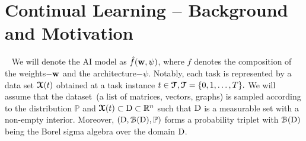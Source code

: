 \section{Continual Learning -- Background and Motivation}~\label{sec:motivation}
We will denote the AI model as $\hat{f}(\boldsymbol{\mathrm{w}}, \psi)$, where  $f$ denotes the composition of the weights$-\boldsymbol{\mathrm{w}}$ and the architecture$-\psi.$ Notably, each task is represented by a data set $\boldsymbol{\mathcal{X}}(t)$ obtained at a task instance $t \in \boldsymbol{\mathcal{T}}, \boldsymbol{\mathcal{T}} = \{0,1,\ldots, T\}.$ We will assume that the dataset~(a list of matrices, vectors, graphs) is sampled according to the distribution $\mathbb{P}$ and $\boldsymbol{\mathcal{X}}(t) \subset \mathrm{D} \subset \mathbb{R}^n$ such that $\mathrm{D}$  is a measurable set with a non-empty interior. Moreover, $(\mathrm{D}, \mathcal{B}(\mathrm{D}), \mathbb{P})$ forms a probability triplet with $\mathcal{B}(\mathrm{D})$ being the Borel sigma algebra over the domain $\mathrm{D}$. 
